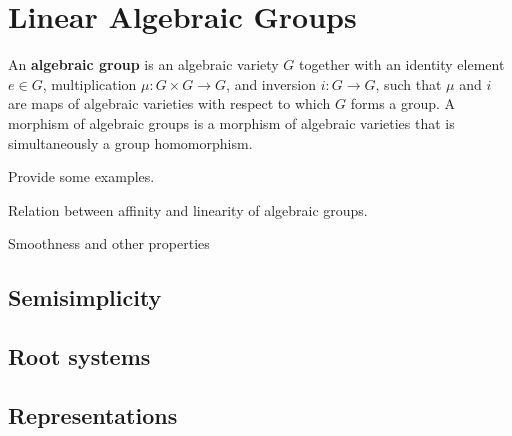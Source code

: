 \chapter{Linear Algebraic Groups}


\begin{definition}
    An \textbf{algebraic group} is an algebraic variety $G$ together with an identity
    element $e\in G$, multiplication $\mu:G\times G\to G$, and inversion
    $i:G\to G$, such that $\mu$ and $i$ are maps of algebraic varieties
    with respect to which $G$ forms a group. A morphism of algebraic groups
    is a morphism of algebraic varieties that is simultaneously a group
    homomorphism.
\end{definition}

\begin{example}
    Provide some examples.
\end{example}

\begin{theorem}
    Relation between affinity and linearity of algebraic groups.
\end{theorem}

\begin{theorem}
    Smoothness and other properties
\end{theorem}

\section{Semisimplicity}
\section{Root systems}
\section{Representations}
